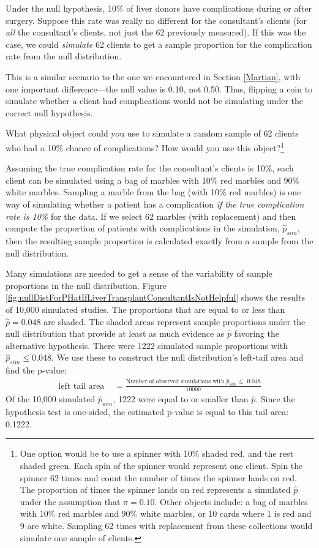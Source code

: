 \documentclass[
  10pt,
  openany]{book}
\theoremstyle{definition}
\theoremstyle{definition}
\theoremstyle{definition}
\theoremstyle{definition}
\theoremstyle{remark}
\begin{document}
Under the null hypothesis, 10\% of liver donors have complications during or after surgery. Suppose this rate was really no different for the consultant's clients (for \emph{all} the consultant's clients, not just the 62 previously measured). If this was the case, we could \emph{simulate} 62 clients to get a sample proportion for the complication rate from the null distribution.

This is a similar scenario to the one we encountered in Section \ref{Martian}, with one important difference---the null value is 0.10, not 0.50. Thus, flipping a coin to simulate whether a client had complications would not be simulating under the correct null hypothesis.

What physical object could you use to simulate a random sample of 62 clients who had a 10\% chance of complications? How would you use this object?\footnote{One option would be to use a spinner with 10\% shaded red, and the rest shaded green. Each spin of the spinner would represent one client. Spin the spinner 62 times and count the number of times the spinner lands on red. The proportion of times the spinner lands on red represents a simulated \(\hat{p}\) under the assumption that \(\pi = 0.10\). Other objects include: a bag of marbles with 10\% red marbles and 90\% white marbles, or 10 cards where 1 is red and 9 are white. Sampling 62 times with replacement from these collections would simulate one sample of clients.}

Assuming the true complication rate for the consultant's clients is 10\%, each client can be simulated using a bag of marbles with 10\% red marbles and 90\% white marbles. Sampling a marble from the bag (with 10\% red marbles) is one way of simulating whether a patient has a complication \emph{if the true complication rate is 10\%} for the data. If we select 62 marbles (with replacement) and then compute the proportion of patients with complications in the simulation, \(\hat{p}_{sim}\), then the resulting sample proportion is calculated exactly from a sample from the null distribution.

Many simulations are needed to get a sense of the variability of sample proportions in the null distribution. Figure \ref{fig:nullDistForPHatIfLiverTransplantConsultantIsNotHelpful} shows the results of 10,000 simulated studies. The proportions that are equal to or less than \(\hat{p}=0.048\) are shaded. The shaded areas represent sample proportions under the null distribution that provide at least as much evidence as \(\hat{p}\) favoring the alternative hypothesis. There were 1222 simulated sample proportions with \(\hat{p}_{sim} \leq 0.048\). We use these to construct the null distribution's left-tail area and find the p-value: \begin{align}
\text{left tail area }\label{estOfPValueBasedOnSimulatedNullForSingleProportion}
    &= \frac{\text{Number of observed simulations with }\hat{p}_{sim}\leq\text{ 0.048}}{10000}
\end{align} Of the 10,000 simulated \(\hat{p}_{sim}\), 1222 were equal to or smaller than \(\hat{p}\). Since the hypothesis test is one-sided, the estimated p-value is equal to this tail area: 0.1222.
\end{document}
